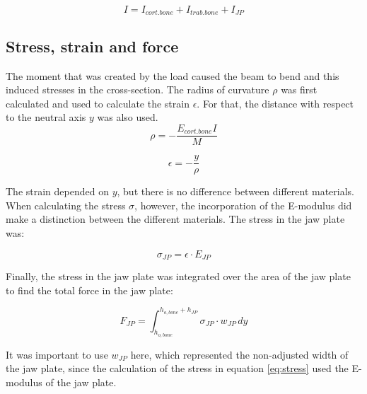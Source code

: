 \begin{subappendices}
\begin{equation}
\label{eq:i3}
I=I_{cort.bone}+I_{trab.bone}+I_{JP}
\end{equation}

\subsection{Stress, strain and force}

The moment that was created by the load caused the beam to bend and this induced stresses in the cross-section. The radius of curvature $\rho$ was first calculated and used to calculate the strain $\epsilon$. For that, the distance with respect to the neutral axis $y$ was also used.
\begin{equation}
\rho =-\frac{E_{cort.bone}I}{M}
\end{equation}

\begin{equation}
\epsilon =-\frac{y}{\rho}
\end{equation}

\noindent The strain depended on $y$, but there is no difference between different materials. When calculating the stress $\sigma$, however, the incorporation of the E-modulus did make a distinction between the different materials. The stress in the jaw plate was:

\begin{equation}
\sigma _{JP} =\epsilon \cdot E_{JP}
\label{eq:stress}
\end{equation}

\noindent Finally, the stress in the jaw plate was integrated over the area of the jaw plate to find the total force in the jaw plate:

\begin{equation}
F_{JP}=\int_{h_{o,bone}}^{h_{o,bone}+h_{JP}} \sigma _{JP}\cdot w_{JP} \,dy
\end{equation}

\noindent It was important to use $w_{JP}$ here, which represented the non-adjusted width of the jaw plate, since the calculation of the stress in equation \ref{eq:stress} used the E-modulus of the jaw plate.


\end{subappendices}


\cleardoublepage
